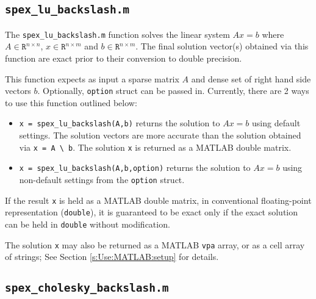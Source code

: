\documentclass[12pt]{report}
\theoremstyle{definition}
\begin{document}
\subsection{\texttt{spex\_lu\_backslash.m}}

The \verb|spex_lu_backslash.m| function solves the linear system $A x = b$ where
$A \in \mathtt{R}^{n \times n}$, $x \in \mathtt{R}^{n \times m}$ and $b \in
\mathtt{R}^{n \times m}$. The final solution vector(s) obtained via this
function are exact prior to their conversion to double precision.

This function expects as input a sparse matrix $A$ and dense set of
right hand side vectors $b$. Optionally, \verb|option| struct can be passed in.
Currently, there are 2 ways to use this function outlined below:

\begin{itemize}

\item \verb|x = spex_lu_backslash(A,b)| returns the solution to $A x =
b$ using default settings. The solution vectors are more accurate than
the solution obtained via \verb|x = A \ b|.  The solution \verb|x| is
returned as a MATLAB double matrix.

\item \verb|x = spex_lu_backslash(A,b,option)| returns the solution to $A x =
b$ using non-default settings from the \verb|option| struct.

\end{itemize}

If the result \verb|x| is held as a MATLAB double matrix, in conventional
floating-point representation (\verb|double|), it is guaranteed to be exact
only if the exact solution can be held in \verb|double| without modification.

The solution \verb|x| may also be returned as a MATLAB \verb|vpa| array, or as
a cell array of strings; See Section \ref{s:Use:MATLAB:setup} for details.

\subsection{\texttt{spex\_cholesky\_backslash.m}}
\end{document}
